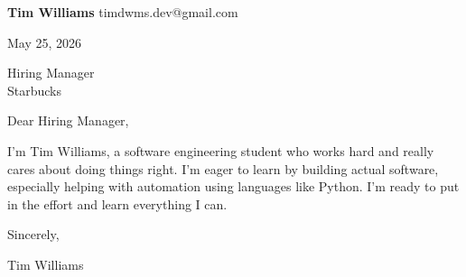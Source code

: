 \documentclass[12pt]{article}
\begin{document}
\textbf{Tim Williams} \hfill timdwms.dev@gmail.com

\vspace{1em}

May 25, 2026

\vspace{1em}

Hiring Manager \\
Starbucks

\vspace{1em}

Dear Hiring Manager,

I'm Tim Williams, a software engineering student who works hard and really cares about doing things right. I’m eager to learn by building actual software, especially helping with automation using languages like Python. I’m ready to put in the effort and learn everything I can.

\vspace{1em}

Sincerely,

\vspace{2em}

Tim Williams
\end{document}
